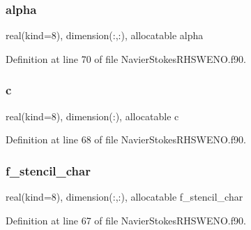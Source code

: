 \subsubsection{\texorpdfstring{alpha}{alpha}}
{\footnotesize\ttfamily real(kind=8), dimension(\+:,\+:), allocatable alpha}



Definition at line 70 of file Navier\+Stokes\+R\+H\+S\+W\+E\+N\+O.\+f90.

\hypertarget{structnavierstokesrhsweno_1_1upwinding__local_ab13afebf281b06a3f8fd7e9583f8cab7}{}\label{structnavierstokesrhsweno_1_1upwinding__local_ab13afebf281b06a3f8fd7e9583f8cab7} 
\subsubsection{\texorpdfstring{c}{c}}
{\footnotesize\ttfamily real(kind=8), dimension(\+:), allocatable c}



Definition at line 68 of file Navier\+Stokes\+R\+H\+S\+W\+E\+N\+O.\+f90.

\hypertarget{structnavierstokesrhsweno_1_1upwinding__local_ae8ab145750afee96ec10369c19e7e70d}{}\label{structnavierstokesrhsweno_1_1upwinding__local_ae8ab145750afee96ec10369c19e7e70d} 
\subsubsection{\texorpdfstring{f\+\_\+stencil\+\_\+char}{f\_stencil\_char}}
{\footnotesize\ttfamily real(kind=8), dimension(\+:,\+:), allocatable f\+\_\+stencil\+\_\+char}



Definition at line 67 of file Navier\+Stokes\+R\+H\+S\+W\+E\+N\+O.\+f90.

\hypertarget{structnavierstokesrhsweno_1_1upwinding__local_ac5f36ae2f61ae9e930e966ab766c02db}{}\label{structnavierstokesrhsweno_1_1upwinding__local_ac5f36ae2f61ae9e930e966ab766c02db} 
